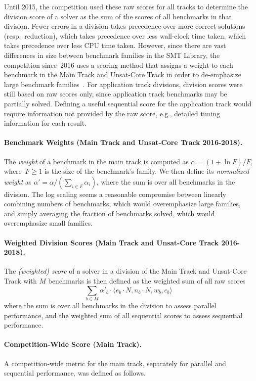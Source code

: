 \documentclass[dvipsnames,table,twoside,11pt]{article}
\newcommand{\maintrack}{Main Track\xspace}
\newcommand{\ucoretrack}{Unsat-Core Track\xspace}
\begin{document}
Until 2015, the competition used these raw scores for all tracks to determine
the division score of a solver as the sum of the scores of all benchmarks in
that division.
Fewer errors in a division takes precedence over more correct solutions
(resp.~reduction), which takes precedence over less wall-clock time taken,
which takes precedence over less CPU time taken.
However, since there are vast differences in size between benchmark families in
the SMT Library, the competition since~2016 uses a scoring method that assigns
a weight to each benchmark in the \maintrack and \ucoretrack in order to
de-emphasize large benchmark families~\cite{rules16,rules17,rules18}.
For application track divisions, division scores were still based on raw scores
only, since application track benchmarks may be partially solved. Defining a
useful sequential score for the application track would require information not
provided by the raw score, e.g., detailed timing information for each result.

\paragraph{Benchmark Weights (\maintrack and \ucoretrack 2016-2018).} The \emph{weight} of a
benchmark in the main track is computed as $\alpha = (1 + \ln F)/F$,
where~$F\geq 1$ is the size of the benchmark's family.  We then define its
\emph{normalized weight} as $\alpha' = \alpha / (\sum_{i\in F} \alpha_i)$,
where the sum is over all benchmarks in the division.  The log scaling seems a
reasonable compromise between linearly combining numbers of benchmarks, which
would overemphasize large families, and simply averaging the fraction of
benchmarks solved, which would overemphasize small families.

\paragraph{Weighted Division Scores (\maintrack and \ucoretrack 2016-2018).}
The \emph{(weighted) score} of a solver in a division of the \maintrack and
\ucoretrack with $M$ benchmarks is then defined as the weighted sum of all raw
scores $$\sum_{b\in M} \alpha'_b \cdot \langle e_b \cdot N, n_b \cdot N,
w_b, c_b\rangle$$ where the sum is over all benchmarks in the division to
assess parallel performance, and the weighted sum of all sequential scores to
assess sequential performance.

\paragraph{Competition-Wide Score (\maintrack).}
A competition-wide metric for the main track, separately for
parallel and sequential performance, was defined as follows.
\end{document}
